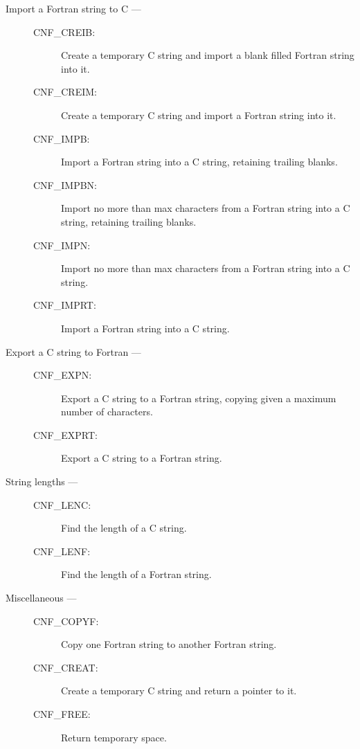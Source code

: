 \begin{description}

\item [Import a Fortran string to C ---]

\begin{description}
\item [CNF\_CREIB:]  Create a temporary C string and import a blank filled Fortran string into it.
\item [CNF\_CREIM:]  Create a temporary C string and import a Fortran string into it.
\item [CNF\_IMPB:]  Import a Fortran string into a C string, retaining trailing blanks.
\item [CNF\_IMPBN:]  Import no more than max characters from a Fortran string into a C string, retaining trailing blanks.
\item [CNF\_IMPN:]  Import no more than max characters from a Fortran string into a C string.
\item [CNF\_IMPRT:]  Import a Fortran string into a C string.
\end{description}

\item [Export a C string to Fortran ---]

\begin{description}
\item [CNF\_EXPN:]  Export a C string to a Fortran string, copying given a maximum number of characters.
\item [CNF\_EXPRT:]  Export a C string to a Fortran string.
\end{description}

\item [String lengths ---]

\begin{description}
\item [CNF\_LENC:]  Find the length of a C string.
\item [CNF\_LENF:]  Find the length of a Fortran string.
\end{description}

\item [Miscellaneous ---]

\begin{description}
\item [CNF\_COPYF:]  Copy one Fortran string to another Fortran string.
\item [CNF\_CREAT:]  Create a temporary C string and return a pointer to it.
\item [CNF\_FREE:]  Return temporary space.
\end{description}

\end{description}


